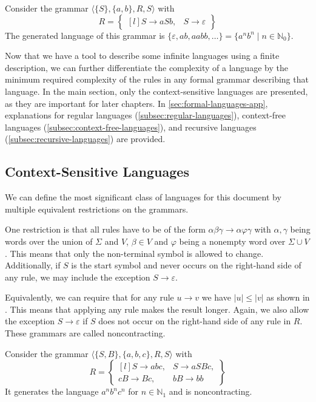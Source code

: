 \begin{exmp}
    Consider the grammar $\langle \{S\}, \{a, b\}, R, S \rangle$ with
    \[
        R = \begin{Bmatrix*}[l]
                S \to aSb,
                &S \to \varepsilon
        \end{Bmatrix*}
    \]
    The generated language of this grammar is $\{\varepsilon, ab, aabb, \dots\} = \{a^{n}b^{n} \mid n \in \mathbb{N}_0\}$.
\end{exmp}

Now that we have a tool to describe some infinite languages using a finite description, we can further differentiate the complexity of a language by the minimum required complexity of the rules in any formal grammar describing that language.
In the main section, only the context-sensitive languages are presented, as they are important for later chapters.
In \cref{sec:formal-languages-app}, explanations for regular languages (\cref{subsec:regular-languages}), context-free languages (\cref{subsec:context-free-languages}), and recursive languages (\cref{subsec:recursive-languages}) are provided.

\subsection{Context-Sensitive Languages}\label{subsec:context-sensitive-languages}

We can define the most significant class of languages for this document by multiple equivalent restrictions on the grammars.

One restriction is that all rules have to be of the form $\alpha\beta\gamma \to \alpha\varphi\gamma$ with $\alpha, \gamma$ being words over the union of $\Sigma$ and $V$, $\beta \in V$ and $\varphi$ being a nonempty word over $\Sigma \cup V$.
This means that only the non-terminal symbol is allowed to change.
Additionally, if $S$ is the start symbol and never occurs on the right-hand side of any rule, we may include the exception $S \to \varepsilon$.

Equivalently, we can require that for any rule $u \to v$ we have $|u| \leq |v|$ as shown in \cite{Parkes2002}.
This means that applying any rule makes the result longer.
Again, we also allow the exception $S \to \varepsilon$ if $S$ does not occur on the right-hand side of any rule in $R$.
These grammars are called noncontracting.

\begin{exmp}
    Consider the grammar $\langle \{S, B\}, \{a, b, c\}, R, S \rangle$ with
    \[
        R = \begin{Bmatrix*}[l]
                S \to abc, &S \to aSBc, \\
                cB \to Bc, &bB \to bb
        \end{Bmatrix*}
    \]
    It generates the language $a^{n}b^{n}c^{n}$ for $n \in \mathbb{N}_{1}$ and is noncontracting.
\end{exmp}

